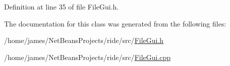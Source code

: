 Definition at line 35 of file File\-Gui.\-h.



The documentation for this class was generated from the following files\-:\begin{DoxyCompactItemize}
\item 
/home/james/\-Net\-Beans\-Projects/ride/src/\hyperlink{_file_gui_8h}{File\-Gui.\-h}\item 
/home/james/\-Net\-Beans\-Projects/ride/src/\hyperlink{_file_gui_8cpp}{File\-Gui.\-cpp}\end{DoxyCompactItemize}
